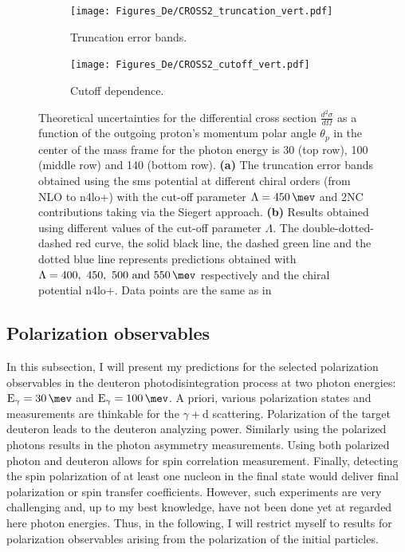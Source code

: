         
    \begin{figure}[h]
        \centering
        \begin{subfigure}[t]{0.46\textwidth}
            \caption{Truncation error bands.}
            \texttt{[image: Figures\_De/CROSS2\_truncation\_vert.pdf]}
            \label{Diff_cross_truncation}
        \end{subfigure}
        \begin{subfigure}[t]{0.46\textwidth}
            \caption{Cutoff dependence.}
            \texttt{[image: Figures\_De/CROSS2\_cutoff\_vert.pdf]}
            \label{Diff_cross_cutoff}
        \end{subfigure}
        \caption{Theoretical uncertainties 
        for the differential cross section $\frac{d^2\sigma}{d\Omega}$
        as a function of the outgoing proton's momentum polar angle $\theta_p$ in the center of the mass frame 
        for the photon energy is \SI{30}{\mev} (top row), \SI{100}{\mev} (middle row) and \SI{140}{\mev} (bottom row).
        {\bf(a)} The truncation error bands obtained using the \gls{sms} potential
        at different chiral orders (from NLO to \gls{n4lo+}) 
        with the cut-off parameter $\Lambda=\SI{450}{\mev}$ and 2NC contributions taking via the Siegert approach.
        {\bf (b)} Results obtained using different values of the cut-off parameter $\Lambda$.
        The double-dotted-dashed red curve, the solid black line, the dashed green line
        and the dotted blue line represents predictions obtained 
        with $\Lambda=\SIlist[list-units = single]{400;450;500;550}{\mev}$ respectively
        and the chiral potential \gls{n4lo+}. 
        Data points are the same as in }
        \label{Diff_cross_err}
    \end{figure}

    \clearpage

    \subsection{Polarization observables}
    \label{sec:polarization_results}

    In this subsection, I will present my predictions for the 
    selected polarization observables in the deuteron photodisintegration process
    at two photon energies: $\text{E}_\gamma = \SI{30}{\mev}$ and
    $\text{E}_\gamma = \SI{100}{\mev}$.
    A priori, various polarization states and measurements
    are thinkable for the $\gamma + \text{d}$ scattering.
    Polarization of the target deuteron leads to the deuteron
    analyzing power.
    Similarly using the polarized photons results in the photon asymmetry measurements.
    Using both polarized photon and deuteron allows for spin
    correlation measurement.
    Finally, detecting the spin polarization of at least one nucleon in the final state would deliver
    final polarization or spin transfer coefficients. 
    However, such experiments are very challenging and, up to my best knowledge,
    have not been done yet at regarded here photon energies.
    Thus, in the following, I will restrict myself to results for polarization
    observables arising from the polarization of the initial particles.

